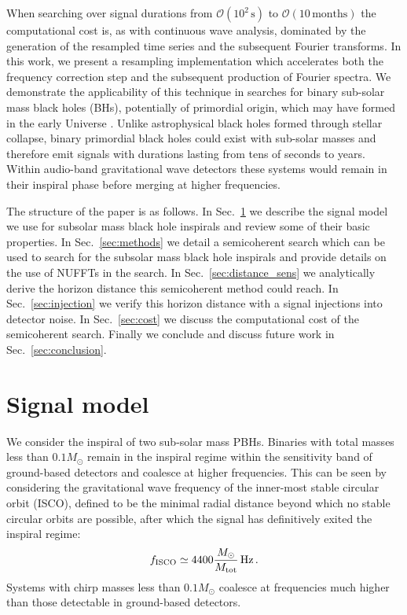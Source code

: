 \documentclass[aps,prd,amsmath,floats,floatfix, twocolumn,
superscriptaddress,nofootinbib,showpacs]{revtex4-2}
\begin{document}
When searching over signal durations from $\mathcal{O}(10^2\,\mathrm{s})$ to $\mathcal{O}(10\,\mathrm{months})$ the computational cost is, as with continuous wave analysis, dominated by the generation of the resampled time series and the subsequent Fourier transforms. In this work, we present a resampling implementation which accelerates both the frequency correction step and the subsequent production of Fourier spectra. We demonstrate the applicability of this technique in searches for binary sub-solar mass black holes (BHs), potentially of primordial origin, which may have formed in the early Universe \cite{Carr:2023tpt}. Unlike astrophysical black holes formed through stellar collapse, binary primordial black holes could exist with sub-solar masses \cite{Carr:1975qj} and therefore emit signals with durations lasting from tens of seconds to years. Within audio-band gravitational wave detectors these systems would remain in their inspiral phase before merging at higher frequencies. 

The structure of the paper is as follows. In Sec.~\ref{sec:signal_model} we describe the signal model we use for subsolar mass black hole inspirals and review some of their basic properties. In Sec.~\ref{sec:methods} we detail a semicoherent search which can be used to search for the subsolar mass black hole inspirals and provide details on the use of NUFFTs in the search. In Sec.~\ref{sec:distance_sens} we analytically derive the horizon distance this semicoherent method could reach. In Sec.~\ref{sec:injection} we verify this horizon distance with a signal injections into detector noise. In Sec.~\ref{sec:cost} we discuss the computational cost of the semicoherent search. Finally we conclude and discuss future work in Sec.~\ref{sec:conclusion}. 

\section{Signal model}
\label{sec:signal_model}
We consider the inspiral of two sub-solar mass PBHs. Binaries with total masses less than $0.1 M_\odot$ remain in the inspiral regime within the sensitivity band of ground-based detectors and coalesce at higher frequencies. This can be seen by considering the gravitational wave frequency of the inner-most stable circular orbit (ISCO), defined to be the minimal radial distance beyond which no stable circular orbits are possible, after which the signal has definitively exited the inspiral regime:
\begin{gather}
    f_{\rm ISCO} \simeq 4400 \frac{M_\odot}{M_{\rm tot}} \, \mathrm{Hz} \, .
\end{gather}
Systems with chirp masses less than $0.1 M_\odot$ coalesce at frequencies much higher than those detectable in ground-based detectors. 
\end{document}
